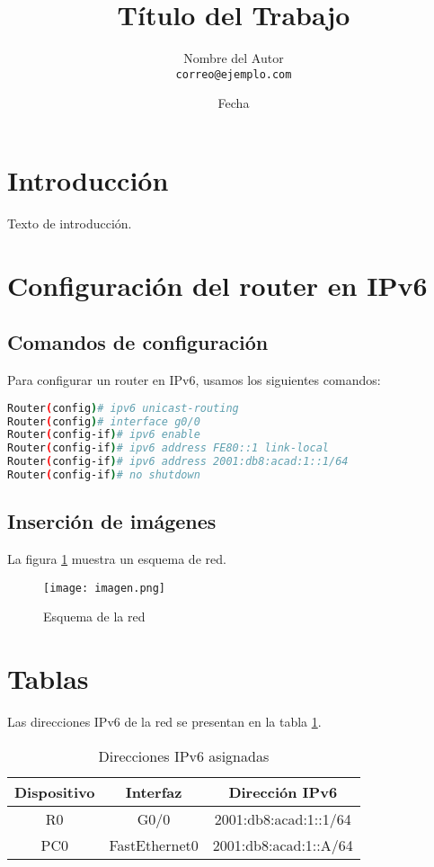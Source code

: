 \documentclass[a4paper,12pt]{article}
\title{Título del Trabajo}
\author{Nombre del Autor\\ \texttt{correo@ejemplo.com}}
\date{Fecha}
\begin{document}
\maketitle

\section{Introducción}
Texto de introducción.

\section{Configuración del router en IPv6}

\subsection{Comandos de configuración}
Para configurar un router en IPv6, usamos los siguientes comandos:

\begin{lstlisting}[language=bash]
Router(config)# ipv6 unicast-routing
Router(config)# interface g0/0
Router(config-if)# ipv6 enable
Router(config-if)# ipv6 address FE80::1 link-local
Router(config-if)# ipv6 address 2001:db8:acad:1::1/64
Router(config-if)# no shutdown
\end{lstlisting}

\subsection{Inserción de imágenes}
La figura \ref{fig:red_local} muestra un esquema de red.

\begin{figure}[h]
    \centering
    \texttt{[image: imagen.png]}
    \caption{Esquema de la red}
    \label{fig:red_local}
\end{figure}

\section{Tablas}
Las direcciones IPv6 de la red se presentan en la tabla \ref{tab:ipv6_addresses}.

\begin{table}[h]
    \centering
    \begin{tabular}{|c|c|c|}
        \hline
        Dispositivo & Interfaz & Dirección IPv6 \\
        \hline
        R0 & G0/0 & 2001:db8:acad:1::1/64 \\
        PC0 & FastEthernet0 & 2001:db8:acad:1::A/64 \\
        \hline
    \end{tabular}
    \caption{Direcciones IPv6 asignadas}
    \label{tab:ipv6_addresses}
\end{table}
\end{document}
